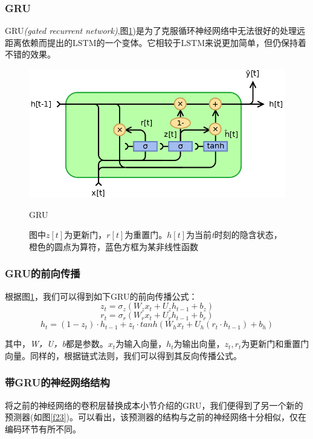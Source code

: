 \documentclass[12pt]{template}
\begin{document}
\subsubsection{GRU}
GRU\textit{(gated recurrent network)},图\ref{f22})是为了克服循环神经网络中无法很好的处理远距离依赖而提出的$\mathrm{LSTM}$的一个变体。它相较于$\mathrm{LSTM}$来说更加简单，但仍保持着不错的效果\cite{DBLP:journals/corr/ChungGCB14}。

\begin{figure}[htb]
    \centering
    \includegraphics[width=13.5cm]{GRU.png}
    \caption{GRU}
    \captionsetup{font=footnotesize,margin=30pt}\caption*{图中\(z[t]\)为更新门，\(r[t]\)为重置门。\(h[t]\)为当前\textit{t}时刻的隐含状态，橙色的圆点为算符，蓝色方框为某非线性函数}
    \label{f22}
\end{figure}

\subsubsection{GRU的前向传播}
根据图\ref{f22}，我们可以得到如下GRU的前向传播公式：
\begin{equation}
z_t=\sigma_z(W_zx_t+U_zh_{t-1}+b_z) 
\end{equation}
\begin{equation}
r_t=\sigma_r(W_rx_t+U_rh_{t-1}+b_r) 
\end{equation}
\begin{equation}
h_t=(1-z_t)\cdot h_{t-1}+z_t\cdot tanh(W_hx_t+U_h(r_t\cdot h_{t-1})+b_h)
\end{equation}

其中，\textit{W，U，b}都是参数。\(x_t\)为输入向量，\(h_t\)为输出向量，\(z_t,r_t\)为更新门和重置门向量。同样的，根据链式法则，我们可以得到其反向传播公式。
\subsubsection{带GRU的神经网络结构}
将之前的神经网络的卷积层替换成本小节介绍的GRU，我们便得到了另一个新的预测器(如图\ref{f23})。可以看出，该预测器的结构与之前的神经网络十分相似，仅在编码环节有所不同。
\end{document}
